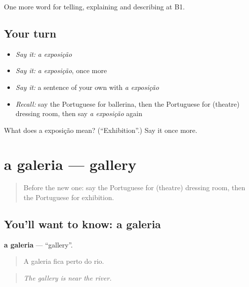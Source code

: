 \begin{grammarlens}[title={What you've built}]
One more word for telling, explaining and describing at B1.
\end{grammarlens}

\subsection*{Your turn}
\begin{itemize}
\raggedright
  \item \emph{Say it:} \emph{a exposição}
  \item \emph{Say it:} \emph{a exposição}, once more
  \item \emph{Say it:} a sentence of your own with \emph{a exposição}
  \item \emph{Recall:} say the Portuguese for ballerina, then the Portuguese for (theatre) dressing room, then say \emph{a exposição} again
\end{itemize}

\begin{tcolorbox}[breakable,colback=teal!4,colframe=teal!35!black,title={Before you move on}]
What does a exposição mean? (\textquotedblleft{}Exhibition\textquotedblright{}.) Say it once more.
\end{tcolorbox}
\section[a galeria]{a galeria — gallery}

\label{lesson:PT-C522-galeria}



\begin{quote}
Before the new one: say the Portuguese for (theatre) dressing room, then the Portuguese for exhibition.
\end{quote}

\subsection*{You'll want to know: a galeria}
\textbf{a galeria} — \textquotedblleft{}gallery\textquotedblright{}.

\begin{quote}
A galeria fica perto do rio.
\end{quote}

\begin{quote}
\emph{The gallery is near the river.}
\end{quote}

